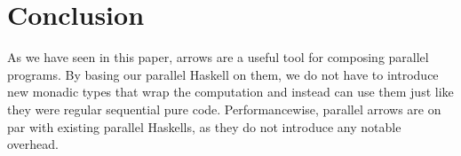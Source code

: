 \section{Conclusion}
As we have seen in this paper, arrows are a useful tool for composing parallel programs. By basing our parallel Haskell on them, we do not have to introduce new monadic types that wrap the computation and instead can use them just like they were regular sequential pure code. Performancewise, parallel arrows are on par with existing parallel Haskells, as they do not introduce any notable overhead.


